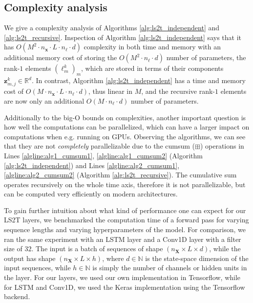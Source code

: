 \documentclass{article} \usepackage{iclr2021_conference,times}
\newcommand{\R}{\mathbb{R}}
\newcommand{\bx}{\mathbf{x}}
\newcommand{\bX}{\mathbf{X}}
\newcommand{\bz}{\mathbf{z}}
\newcommand{\NN}{\mathbb{N}}
\theoremstyle{plain}
\theoremstyle{definition}
\begin{document}
\subsection{Complexity analysis} \label{app:complexity}
We give a complexity analysis of Algorithms \ref{alg:ls2t_independent} and \ref{alg:ls2t_recursive}. Inspection of Algorithm \ref{alg:ls2t_independent} says that it has $O(M^2 \cdot n_\bx \cdot L \cdot n_\ell \cdot d)$ complexity in both time and memory with an additional memory cost of storing the $O(M^2 \cdot n_\ell \cdot d)$ number of parameters, the rank-$1$ elements $(\ell^k_m)_m$, which are stored in terms of their components $\bz_{m, j}^k \in \R^d$. In contrast, Algorithm \ref{alg:ls2t_independent} has  a time and memory cost of $O(M \cdot n_\bx \cdot L \cdot n_\ell \cdot d)$, thus linear in $M$, and the recursive rank-$1$ elements are now only an additional $O(M \cdot n_\ell \cdot d)$ number of parameters.

Additionally to the big-O bounds on complexities, another important question is how well the computations can be parallelized, which can have a larger impact on computations when e.g. running on GPUs. Observing the algorithms, we can see that they are not \emph{completely} parallelizable due to the cumsum ($\boxplus$) operations in Lines \ref{algline:alg1_cumsum1}, \ref{algline:alg1_cumsum2} (Algorithm \ref{alg:ls2t_independent}) and Lines \ref{algline:alg2_cumsum1}, \ref{algline:alg2_cumsum2} (Algorithm \ref{alg:ls2t_recursive}). The cumulative sum operates recursively on the whole time axis, therefore it is not parallelizable, but can be computed very efficiently on modern architectures.

To gain further intuition about what kind of performance one can expect for our LS2T layers, we benchmarked the computation time of a forward pass for varying sequence lengths and varying hyperparameters of the model. For comparison, we ran the same experiment with an LSTM layer and a Conv1D layer with a filter size of $32$. The input is a batch of sequences of shape $(n_\bX \times L \times d)$, while the output has shape $(n_\bX \times L \times h)$, where $d \in \NN$ is the state-space dimension of the input sequences, while $h \in \NN$ is simply the number of channels or hidden units in the layer. For our layers, we used our own implementation in Tensorflow, while for LSTM and Conv1D, we used the Keras implementation using the Tensorflow backend. 
\end{document}
